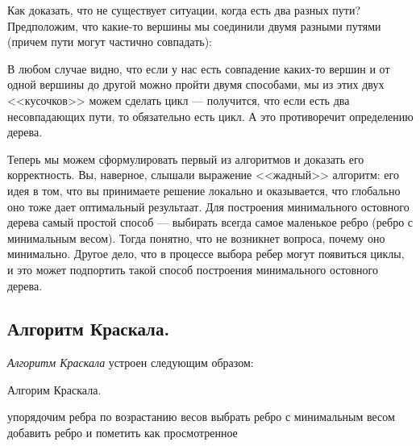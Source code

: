 \documentclass[russian]{lecture-notes}
\begin{document}
\begin{enumerate}
		Как доказать, что не существует ситуации, когда есть два разных пути? Предположим, что какие-то вершины мы соединили двумя разными путями (причем пути могут частично совпадать):
		
		\begin{figure}[h]
			\centering
		\end{figure}
		
		В любом случае видно, что если у нас есть совпадение каких-то вершин и от одной вершины до другой можно пройти двумя способами, мы из этих двух <<кусочков>> можем сделать цикл --- получится, что если есть два несовпадающих пути, то обязательно есть цикл. А это противоречит определению дерева. 
	\end{enumerate}
	
	Теперь мы можем сформулировать первый из алгоритмов и доказать его корректность. Вы, наверное, слышали выражение <<жадный>> алгоритм: его идея в том, что вы принимаете решение локально и оказывается, что глобально оно тоже дает оптимальный результаат. Для построения минимального остовного дерева самый простой способ --- выбирать всегда самое маленькое ребро (ребро с минимальным весом). Тогда понятно, что не возникнет вопроса, почему оно минимально. Другое дело, что в процессе выбора ребер могут появиться циклы, и это может  подпортить такой способ построения минимального остовного дерева.\\ 
	
	\subsection*{Алгоритм Краскала.}
	{\em Алгоритм Краскала} устроен следующим образом: 
	
	\begin{algorithm}[H]
		\caption{Алгорим Краскала.}
		\label{alg:two}
		\begin{algorithmic}
			\State упорядочим ребра по возрастанию весов
				\State выбрать ребро с минимальным весом
					\State добавить ребро и пометить как просмотренное
				\EndIf
			\EndFor
		\end{algorithmic}
	\end{algorithm}
	
\end{document}
